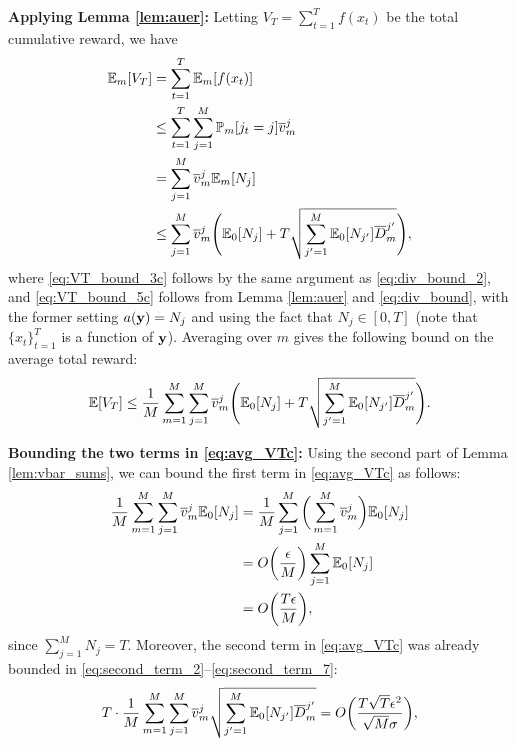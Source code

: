 \documentclass[english,onecolumn,final,11pt]{IEEEtran} %
\newcommand{\Dbar}{\overline{D}}
\begin{document}
{\bf Applying Lemma \ref{lem:auer}:} Letting $V_T = \sum_{t=1}^T f(x_t)$ be the total cumulative reward, we have
\begin{align}
	\EE_{m}[V_T] 
		&= \sum_{t=1}^T \EE_m[ f(x_t) ] \\
		&\le \sum_{t=1}^T \sum_{j=1}^M \PP_m[j_t = j] \vbar_m^j \label{eq:VT_bound_3c} \\
		&= \sum_{j=1}^M \vbar_m^j \EE_m[N_j] \\
		&\le \sum_{j=1}^M \vbar_m^j \Bigg( \EE_0[N_j] + T \sqrt{ \sum_{j'=1}^M \EE_0[N_{j'}]\Dbar_m^{j'} } \Bigg), \label{eq:VT_bound_5c}
\end{align}
where \eqref{eq:VT_bound_3c} follows by the same argument as \eqref{eq:div_bound_2}, and \eqref{eq:VT_bound_5c} follows from Lemma \ref{lem:auer} and \eqref{eq:div_bound}, with the former setting $a(\mathbf{y}) = N_j$ and using the fact that $N_j \in [0,T]$ (note that $\{x_t\}_{t=1}^T$ is a function of $\mathbf{y}$).  Averaging over $m$ gives the following bound on the average total reward:
\begin{equation}
	\EE[V_T] \le \frac{1}{M}\sum_{m=1}^M \sum_{j=1}^M \vbar_m^j \Bigg( \EE_0[N_j] + T \sqrt{ \sum_{j'=1}^M \EE_0[N_{j'}]\Dbar_m^{j'} } \Bigg). \label{eq:avg_VTc}
\end{equation}

\textbf{Bounding the two terms in \eqref{eq:avg_VTc}:}  Using the second part of Lemma \ref{lem:vbar_sums}, we can bound the first term in \eqref{eq:avg_VTc} as follows:
\begin{align}
	\frac{1}{M}\sum_{m=1}^M \sum_{j=1}^M \overline{v}_m^j \mathbb{E}_0[N_j] &= \frac{1}{M}\sum_{j=1}^M \bigg(\sum_{m=1}^M  \overline{v}_m^j\bigg) \mathbb{E}_0[N_j] \\
	& = O\bigg(\frac{\epsilon}{M}\bigg) \sum_{j=1}^M \mathbb{E}_0[N_j] \\
	& = O\bigg(\frac{T\epsilon}{M}\bigg), \label{eq:first_term_3c}
\end{align}
since $\sum_{j=1}^M N_j = T$.  Moreover, the second term in \eqref{eq:avg_VTc} was already bounded in \eqref{eq:second_term_2}--\eqref{eq:second_term_7}:
\begin{equation}
    T\cdot\frac{1}{M}\sum_{m=1}^M \sum_{j=1}^M \vbar_m^j \sqrt{ \sum_{j'=1}^M \EE_0[N_{j'}]\Dbar_m^{j'} }= O\bigg(\frac{T\sqrt{T}\epsilon^2}{\sqrt{M} \sigma}\bigg), \label{eq:second_term_7c}
\end{equation}
\end{document}
